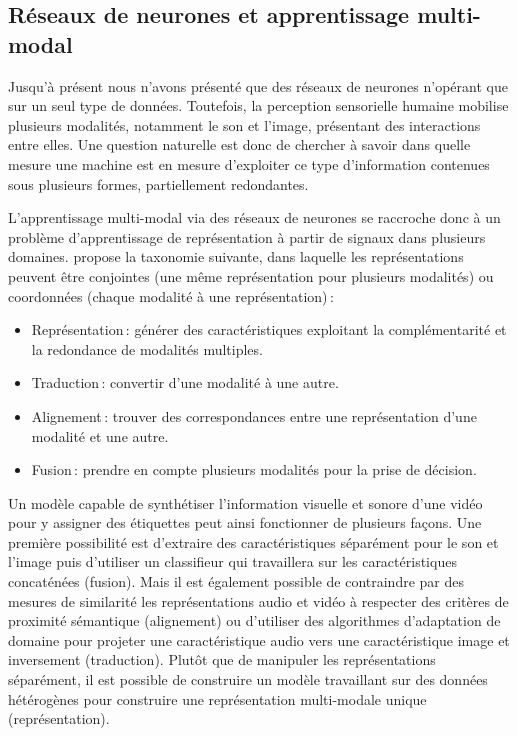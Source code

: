 \subsection{Réseaux de neurones et apprentissage multi-modal}

Jusqu'à présent nous n'avons présenté que des réseaux de neurones n'opérant que sur un seul type de données. Toutefois, la perception sensorielle humaine mobilise plusieurs modalités, notamment le son et l'image, présentant des interactions entre elles. Une question naturelle est donc de chercher à savoir dans quelle mesure une machine est en mesure d'exploiter ce type d'information contenues sous plusieurs formes, partiellement redondantes.

L'apprentissage multi-modal via des réseaux de neurones se raccroche donc à un problème d'apprentissage de représentation à partir de signaux dans plusieurs domaines. \citet{baltrusaitis_multimodal_2017} propose la taxonomie suivante, dans laquelle les représentations peuvent être conjointes (une même représentation pour plusieurs modalités) ou coordonnées (chaque modalité à une représentation)\,:
\begin{itemize}
    \item Représentation\,: générer des caractéristiques exploitant la complémentarité et la redondance de modalités multiples.
    \item Traduction\,: convertir d'une modalité à une autre.
    \item Alignement\,: trouver des correspondances entre une représentation d'une modalité et une autre.
    \item Fusion\,: prendre en compte plusieurs modalités pour la prise de décision.
\end{itemize}

Un modèle capable de synthétiser l'information visuelle et sonore d'une vidéo pour y assigner des étiquettes peut ainsi fonctionner de plusieurs façons. Une première possibilité est d'extraire des caractéristiques séparément pour le son et l'image puis d'utiliser un classifieur qui travaillera sur les caractéristiques concaténées (fusion). Mais il est également possible de contraindre par des mesures de similarité les représentations audio et vidéo à respecter des critères de proximité sémantique (alignement) ou d'utiliser des algorithmes d'adaptation de domaine pour projeter une caractéristique audio vers une caractéristique image et inversement (traduction). Plutôt que de manipuler les représentations séparément, il est possible de construire un modèle travaillant sur des données hétérogènes pour construire une représentation multi-modale unique (représentation).


